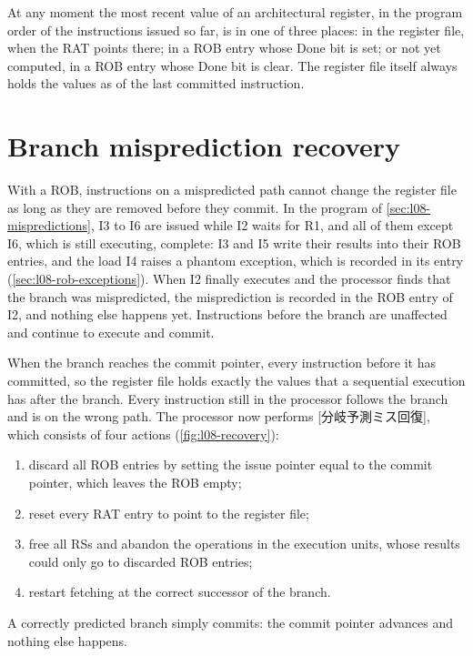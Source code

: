 \documentclass[../main.tex]{subfiles}
\begin{document}
\begin{note}
  At any moment the most recent value of an architectural register, in the
  program order of the instructions issued so far, is in one of three places:
  in the register file, when the RAT points there; in a ROB entry whose Done
  bit is set; or not yet computed, in a ROB entry whose Done bit is clear.  The
  register file itself always holds the values as of the last committed
  instruction.
\end{note}

\section{Branch misprediction recovery}
\label{sec:l08-recovery}

With a ROB, instructions on a mispredicted path cannot change the register
file as long as they are removed before they commit.  In the program of \cref{sec:l08-mispredictions}, I3 to
I6 are issued while I2 waits for R1, and all of them except I6, which is
still executing, complete: I3 and I5 write their results into their ROB
entries, and the load I4 raises a phantom exception, which is recorded in its
entry (\cref{sec:l08-rob-exceptions}).  When I2 finally executes and
the processor finds that the branch was mispredicted, the misprediction is
recorded in the ROB entry of I2, and nothing else happens yet.  Instructions
before the branch are unaffected and continue to execute and commit.

When the branch reaches the commit pointer, every instruction before it has
committed, so the register file holds exactly the values that a sequential
execution has after the branch.  Every instruction still in the processor
follows the branch and is on the wrong path.  The processor now performs
[分岐予測ミス回復], which consists of four
actions (\cref{fig:l08-recovery}):
\begin{enumerate}
  \item discard all ROB entries by setting the issue pointer equal to the
    commit pointer, which leaves the ROB empty;
  \item reset every RAT entry to point to the register file;
  \item free all RSs and abandon the operations in the execution units, whose
    results could only go to discarded ROB entries;
  \item restart fetching at the correct successor of the branch.
\end{enumerate}
A correctly predicted branch simply commits: the commit pointer advances and
nothing else happens.
\end{document}
